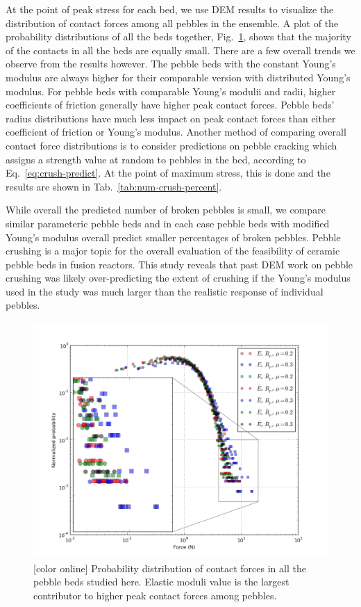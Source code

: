 At the point of peak stress for each bed, we use DEM results to visualize the distribution of contact forces among all pebbles in the ensemble. A plot of the probability distributions of all the beds together, Fig.~\ref{fig:all-contact-forces}, shows that the majority of the contacts in all the beds are equally small. There are a few overall trends we observe from the results however. The pebble beds with the constant Young's modulus are always higher for their comparable version with distributed Young's modulus. For pebble beds with comparable Young's modulii and radii, higher coefficients of friction generally have higher peak contact forces. Pebble beds' radius distributions have much less impact on peak contact forces than either coefficient of friction or Young’s modulus. Another method of comparing overall contact force distributions is to consider predictions on pebble cracking which assigns a strength value at random to pebbles in the bed, according to Eq.~\ref{eq:crush-predict}. At the point of maximum stress, this is done and the results are shown in Tab.~\ref{tab:num-crush-percent}.

While overall the predicted number of broken pebbles is small, we compare similar parameteric pebble beds and in each case pebble beds with modified Young’s modulus overall predict smaller percentages of broken pebbles. Pebble crushing is a major topic for the overall evaluation of the feasibility of ceramic pebble beds in fusion reactors. This study reveals that past DEM work on pebble crushing was likely over-predicting the extent of crushing if the Young's modulus used in the study was much larger than the realistic response of individual pebbles.

\begin{figure}[t]
  \centering
  \includegraphics[width = 0.75 \textwidth]{chapters/figures/all-contact-forces}
  \caption{[color online] Probability distribution of contact forces in all the pebble beds studied here. Elastic moduli value is the largest contributor to higher peak contact forces among pebbles.}\label{fig:all-contact-forces}
\end{figure}


